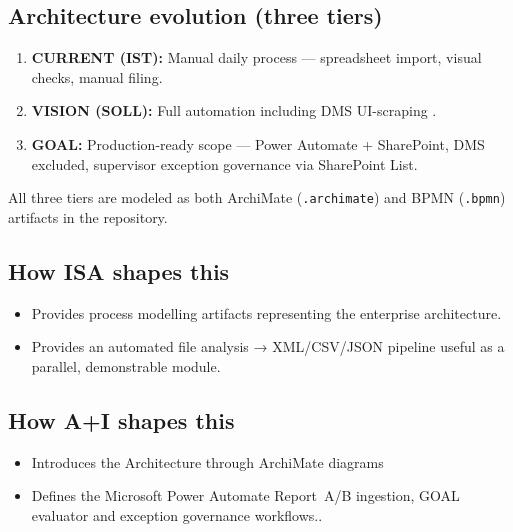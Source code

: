 \documentclass[11pt,a4paper]{article}
\begin{document}
\subsection*{Architecture evolution (three tiers)}
\begin{enumerate}[leftmargin=*, nosep]
  \item \textbf{CURRENT (IST):} Manual daily process --- spreadsheet import, visual checks, manual filing.
  \item \textbf{VISION (SOLL):} Full automation including DMS UI-scraping .
  \item \textbf{GOAL:} Production-ready scope --- Power Automate + SharePoint, DMS excluded, supervisor exception governance via SharePoint List.
\end{enumerate}
All three tiers are modeled as both ArchiMate (\texttt{.archimate}) and BPMN (\texttt{.bpmn}) artifacts in the repository.

\subsection*{How ISA shapes this}
\begin{itemize}[leftmargin=*, nosep]
  \item Provides process modelling artifacts representing the enterprise architecture.
  \item Provides an automated file analysis → XML/CSV/JSON pipeline useful as a parallel, demonstrable module.
\end{itemize}

\subsection*{How A+I shapes this}
\begin{itemize}[leftmargin=*, nosep]
  \item Introduces the Architecture through ArchiMate diagrams 
  \item Defines the Microsoft Power Automate Report~A/B  ingestion, GOAL evaluator and exception governance workflows..
\end{itemize}
\end{document}
